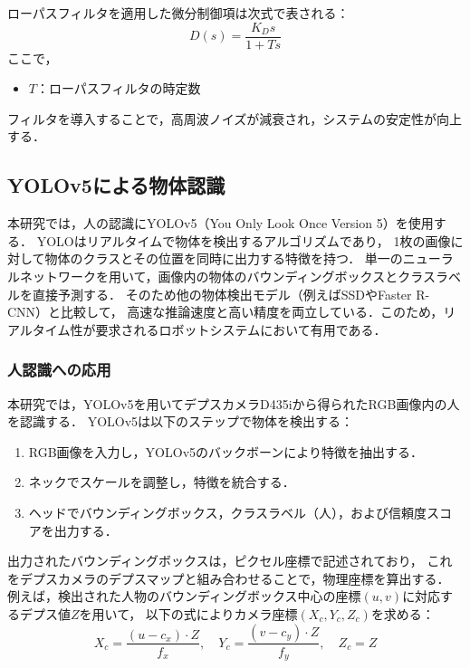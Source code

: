 ローパスフィルタを適用した微分制御項は次式で表される：
\begin{equation}
    D(s) = \frac{K_D s}{1 + T s}
    \label{eq:lowpass_filter}
\end{equation}
ここで，
\begin{itemize}
    \item $T$：ローパスフィルタの時定数
\end{itemize}

フィルタを導入することで，高周波ノイズが減衰され，システムの安定性が向上する．

\subsection{YOLOv5による物体認識}
本研究では，人の認識にYOLOv5（You Only Look Once Version 5）を使用する．
YOLOはリアルタイムで物体を検出するアルゴリズムであり，
1枚の画像に対して物体のクラスとその位置を同時に出力する特徴を持つ．
単一のニューラルネットワークを用いて，画像内の物体のバウンディングボックスとクラスラベルを直接予測する\cite{yolo}．
そのため他の物体検出モデル（例えばSSDやFaster R-CNN）と比較して，
高速な推論速度と高い精度を両立している．このため，リアルタイム性が要求されるロボットシステムにおいて有用である．

\subsubsection{人認識への応用}
本研究では，YOLOv5を用いてデプスカメラD435iから得られたRGB画像内の人を認識する．
YOLOv5は以下のステップで物体を検出する：
\begin{enumerate}
    \item RGB画像を入力し，YOLOv5のバックボーンにより特徴を抽出する．
    \item ネックでスケールを調整し，特徴を統合する．
    \item ヘッドでバウンディングボックス，クラスラベル（人），および信頼度スコアを出力する．
\end{enumerate}

出力されたバウンディングボックスは，ピクセル座標で記述されており，
これをデプスカメラのデプスマップと組み合わせることで，物理座標を算出する．
例えば，検出された人物のバウンディングボックス中心の座標$(u, v)$に対応するデプス値$Z$を用いて，
以下の式によりカメラ座標$(X_c, Y_c, Z_c)$を求める：
\begin{equation}
    X_c = \frac{(u - c_x) \cdot Z}{f_x}, \quad
    Y_c = \frac{(v - c_y) \cdot Z}{f_y}, \quad
    Z_c = Z
\end{equation}


